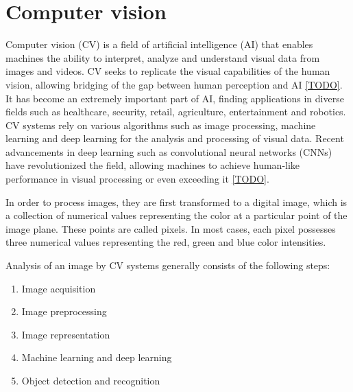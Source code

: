 \section{Computer vision}

Computer vision (CV) is a field of artificial intelligence (AI) that enables machines the ability to interpret, analyze and understand visual data from images and videos.
CV seeks to replicate the visual capabilities of the human vision, allowing bridging of the gap between human perception and AI \cref{TODO}.
It has become an extremely important part of AI, finding applications in diverse fields such as healthcare, security, retail, agriculture, entertainment and robotics.
CV systems rely on various algorithms such as image processing, machine learning and deep learning for the analysis and processing of visual data.
Recent advancements in deep learning such as convolutional neural networks (CNNs) have revolutionized the field, allowing machines to achieve human-like performance in visual processing or even exceeding it \cref{TODO}.

In order to process images, they are first transformed to a digital image, which is a collection of numerical values representing the color at a particular point of the image plane.
These points are called pixels.
In most cases, each pixel possesses three numerical values representing the red, green and blue color intensities.

Analysis of an image by CV systems generally consists of the following steps:
\begin{enumerate}
    \item Image acquisition
    \item Image preprocessing
    \item Image representation
    \item Machine learning and deep learning
    \item Object detection and recognition
\end{enumerate}



